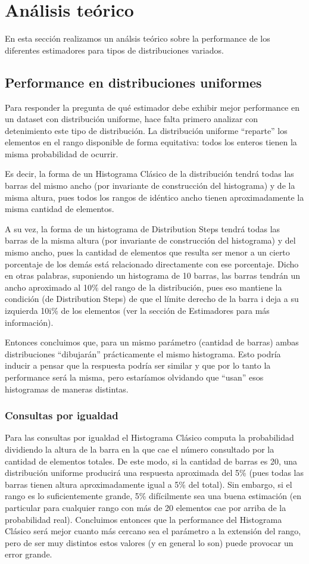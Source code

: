 \section{Análisis teórico}
En esta sección realizamos un análsis teórico sobre la performance de los diferentes estimadores para tipos de distribuciones variados.

\subsection{Performance en distribuciones uniformes}
Para responder la pregunta de qué estimador debe exhibir mejor performance en un dataset con distribución uniforme, hace falta primero analizar con detenimiento este tipo de distribución. La distribución uniforme ``reparte'' los elementos en el rango disponible de forma equitativa: todos los enteros tienen la misma probabilidad de ocurrir.

Es decir, la forma de un Histograma Clásico de la distribución tendrá todas las barras del mismo ancho (por invariante de construcción del histograma) y de la misma altura, pues todos los rangos de idéntico ancho tienen aproximadamente la misma cantidad de elementos.

A su vez, la forma de un histograma de Distribution Steps tendrá todas las barras de la misma altura (por invariante de construcción del histograma) y del mismo ancho, pues la cantidad de elementos que resulta ser menor a un cierto porcentaje de los demás está relacionado directamente con ese porcentaje. Dicho en otras palabras, suponiendo un histograma de 10 barras, las barras tendrán un ancho aproximado al 10\% del rango de la distribución, pues eso mantiene la condición (de Distribution Steps) de que el límite derecho de la barra i deja a su izquierda 10i\% de los elementos (ver la sección de Estimadores para más información).

Entonces concluimos que, para un mismo parámetro (cantidad de barras) ambas distribuciones ``dibujarán'' prácticamente el mismo histograma. Esto podría inducir a pensar que la respuesta podría ser similar y que por lo tanto la performance será la misma, pero estaríamos olvidando que ``usan'' esos histogramas de maneras distintas.

\subsubsection{Consultas por igualdad}
Para las consultas por igualdad el Histograma Clásico computa la probabilidad dividiendo la altura de la barra en la que cae el número consultado por la cantidad de elementos totales. De este modo, si la cantidad de barras es 20, una distribución uniforme producirá una respuesta aproximada del 5\% (pues todas las barras tienen altura aproximadamente igual a 5\% del total). Sin embargo, si el rango es lo suficientemente grande, 5\% difícilmente sea una buena estimación (en particular para cualquier rango con más de 20 elementos cae por arriba de la probabilidad real). Concluimos entonces que la performance del Histograma Clásico será mejor cuanto más cercano sea el parámetro a la extensión del rango, pero de ser muy distintos estos valores (y en general lo son) puede provocar un error grande.

